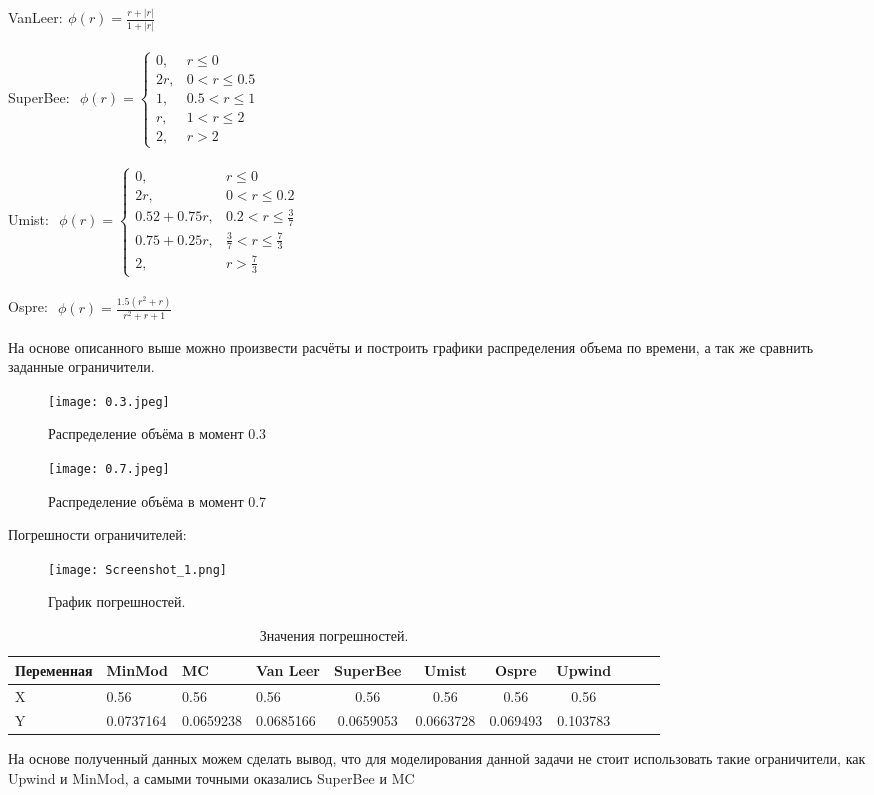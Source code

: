 VanLeer:$
\begin{aligned}
    \phi(r)=\frac{r+|r|}{1+|r|}
\end{aligned}
$


SuperBee: $
\begin{aligned}
    \phi(r)=\begin{cases}
        0, &r\leq 0\\
        2r, &0<r\leq 0.5\\
        1, &0.5<r\leq 1\\
        r, &1<r\leq 2\\
        2, &r>2
    \end{cases}
\end{aligned}
$


Umist: $
\begin{aligned}
    \phi(r)=\begin{cases}
        0, &r\leq 0\\
        2r, &0<r\leq 0.2\\
        0.52+0.75r, &0.2<r\leq \frac{3}{7}\\
        0.75+0.25r, &\frac{3}{7}<r\leq \frac{7}{3}\\
        2, &r>\frac{7}{3}
    \end{cases}
\end{aligned}
$


Ospre: $
\begin{aligned}
   \phi(r)=
    \frac{1.5(r^2+r)}{r^2+r+1}
\end{aligned}
$


На основе описанного выше можно произвести расчёты и построить графики распределения объема по времени, а так же сравнить
заданные ограничители.

\begin{figure}[h]
    \centering
    \texttt{[image: 0.3.jpeg]}
    \caption{Распределение объёма в момент 0.3}
    \label{03}
\end{figure}

\begin{figure}[h]
    \centering
     \texttt{[image: 0.7.jpeg]}
    \caption{Распределение объёма в момент 0.7}
    \label{07}
\end{figure}


Погрешности ограничителей:
\begin{figure}[h]
    \centering
     \texttt{[image: Screenshot\_1.png]}
    \caption{График погрешностей.}
    \label{norms}
\end{figure}

\begin{table}[tp]
\caption {Значения погрешностей.}
\label{tab:norms}
\begin{tabular}{|l|l|l|l|c|c|c|c|c|c|c|}
\hline
Переменная & MinMod & MC & Van Leer & SuperBee & Umist & Ospre & Upwind\\
\hline
X & 0.56 & 0.56 & 0.56 & 0.56 & 0.56 & 0.56 & 0.56 \\
\hline
Y & 0.0737164 & 0.0659238 & 0.0685166 & 0.0659053 & 0.0663728 & 0.069493 & 0.103783 \\
\hline
\end{tabular}
\end{table}

На основе полученный данных можем сделать вывод, что для моделирования данной задачи не стоит использовать такие ограничители, как
Upwind и MinMod, а самыми точными оказались SuperBee и MC